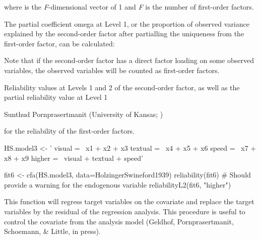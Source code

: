 \documentclass[a4paper]{book}
\begin{document}
\begin{Details}

where  is the \emph{F}-dimensional vector of 1 and \emph{F} is the number of first-order factors. 

The partial coefficient omega at Level 1, or the proportion of observed variance explained by the second-order factor after partialling the uniqueness from the first-order factor, can be calculated:


Note that if the second-order factor has a direct factor loading on some observed variables, the observed variables will be counted as first-order factors.
\end{Details}
%
\begin{Value}
Reliability values at Levels 1 and 2 of the second-order factor, as well as the partial reliability value at Level 1
\end{Value}
%
\begin{Author}\relax
Sunthud Pornprasertmanit (University of Kansas; )
\end{Author}
%
\begin{SeeAlso}\relax
{} for the reliability of the first-order factors.
\end{SeeAlso}
%
\begin{Examples}
\begin{ExampleCode}
HS.model3 <- ' visual  =~ x1 + x2 + x3
              textual =~ x4 + x5 + x6
              speed   =~ x7 + x8 + x9 
			  higher =~ visual + textual + speed'

fit6 <- cfa(HS.model3, data=HolzingerSwineford1939)
reliability(fit6) # Should provide a warning for the endogenous variable
reliabilityL2(fit6, "higher")
\end{ExampleCode}
\end{Examples}
%
\begin{Description}\relax
This function will regress target variables on the covariate and replace the target variables by the residual of the regression analysis. This procedure is useful to control the covariate from the analysis model (Geldhof, Pornprasertmanit, Schoemann, \& Little, in press).
\end{Description}
\end{document}
